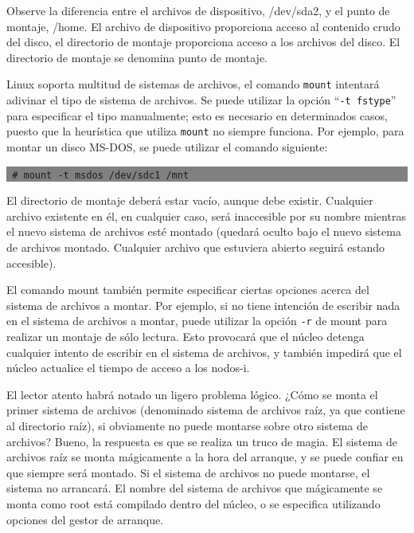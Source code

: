 \documentclass[12pt]{article}
\begin{document}
Observe la diferencia entre el archivos de dispositivo, /dev/sda2, y el 
punto de montaje, /home. El archivo de dispositivo proporciona acceso al 
contenido crudo del disco, el directorio de montaje proporciona acceso a 
los archivos del disco. El directorio de montaje se denomina punto de 
montaje.

Linux soporta multitud de sistemas de archivos, el comando \texttt{mount}
intentará adivinar el tipo de sistema de archivos. Se puede utilizar 
la opción ``\texttt{-t fstype}'' para especificar el tipo manualmente; 
esto es necesario en determinados casos, puesto que la heurística que 
utiliza \texttt{mount} no siempre funciona. Por ejemplo, para montar
un disco MS-DOS, se puede utilizar el comando siguiente:

\colorbox{grey}{\parbox[t]{0.95\linewidth}{ \vspace*{0.5cm} { 
{\tt
\# mount -t msdos /dev/sdc1 /mnt
}
} \vspace*{0.5cm} } } 

El directorio de montaje deberá estar vacío, aunque debe existir. 
Cualquier archivo existente en él, en cualquier caso, será inaccesible 
por su nombre mientras el nuevo sistema de archivos esté montado 
(quedará oculto bajo el nuevo sistema de archivos montado. Cualquier 
archivo que estuviera abierto seguirá estando accesible). 

El comando mount también permite especificar ciertas opciones acerca del 
sistema de archivos a montar. Por ejemplo, si no tiene intención de 
escribir nada en el sistema de archivos a montar, puede utilizar la 
opción  \texttt{-r} de mount para realizar un montaje de sólo lectura. 
Esto provocará que el núcleo detenga cualquier intento de escribir en el 
sistema de archivos, y también impedirá que el núcleo actualice el tiempo 
de acceso a los nodos-i.

El lector atento habrá notado un ligero problema lógico. ¿Cómo se monta 
el primer sistema de archivos (denominado sistema de archivos raíz, ya que 
contiene al directorio raíz), si obviamente no puede montarse sobre otro 
sistema de archivos? Bueno, la respuesta es que se realiza un truco de
 magia. El sistema de archivos raíz se monta mágicamente a la hora 
del arranque, y se puede confiar en que siempre será montado. Si el 
sistema de archivos no puede montarse, el sistema no arrancará. El 
nombre del sistema de archivos que mágicamente se monta como root está 
compilado dentro del núcleo, o se especifica utilizando opciones del gestor
de arranque.
\end{document}
